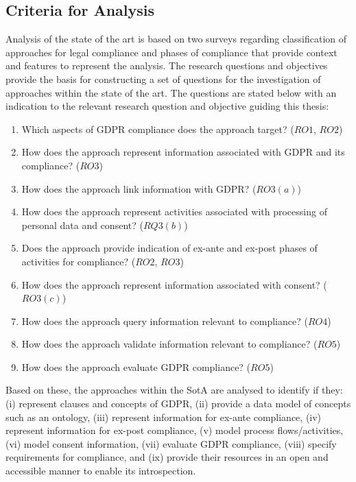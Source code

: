 \subsection{Criteria for Analysis}
Analysis of the state of the art is based on two surveys regarding
classification of approaches for legal compliance \cite{otto_addressing_2007} and phases of compliance \cite{fellmann_state---art_2014} that provide context and features to represent the analysis.
The research questions and objectives provide the basis for constructing a set of questions for the investigation of approaches within the state of the art.
The questions are stated below with an indication to the relevant research question and objective guiding this thesis:
\begin{enumerate}
    \item Which aspects of GDPR compliance does the approach target? ($RO1$, $RO2$)
    \item How does the approach represent information associated with GDPR and its compliance? ($RO3$)
    \item How does the approach link information with GDPR? ($RO3(a)$)
    \item How does the approach represent activities associated with processing of personal data and consent? ($RQ3(b)$)
    \item Does the approach provide indication of ex-ante and ex-post phases of activities for compliance? ($RO2$, $RO3$)
    \item How does the approach represent information associated with consent? ($RO3(c)$)
    \item How does the approach query information relevant to compliance? ($RO4$)
    \item How does the approach validate information relevant to compliance? ($RO5$)
    \item How does the approach evaluate GDPR compliance? ($RO5$)
\end{enumerate}

Based on these, the approaches within the SotA are analysed to identify if they: (i) represent clauses and concepts of GDPR, (ii) provide a data model of concepts such as an ontology, (iii) represent information for ex-ante compliance, (iv) represent information for ex-post compliance, (v) model process flows/activities, (vi) model consent information, (vii) evaluate GDPR compliance, (viii) specify requirements for compliance, and (ix) provide their resources in an open and accessible manner to enable its introspection.

